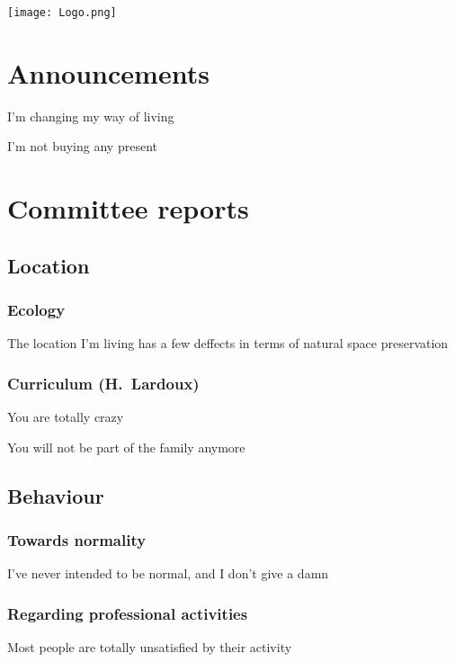\documentclass[11pt]{meetingmins}
\date{}
\begin{document}
\hspace*{-1cm}\texttt{[image: Logo.png]}
\maketitle

\section{Announcements}
\begin{hiddenitems}
\item
I'm changing my way of living

\item
I'm not buying any present

\end{hiddenitems}

\section{Committee reports}

\subsection{Location}
\subsubsection{Ecology}
The location I'm living has a few deffects in terms of natural space preservation
\subsubsection{Curriculum {\rm (H.~Lardoux)}}
\begin{hiddensubitems}
\item
You are totally crazy
\item
You will not be part of the family anymore
\end{hiddensubitems}

\subsection{Behaviour}
\subsubsection{Towards normality}
I've never intended to be normal, and I don't give a damn
\subsubsection{Regarding professional activities}
Most people are totally unsatisfied by their activity
\end{document}
